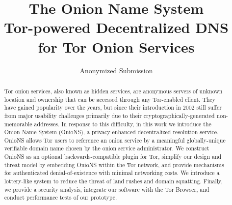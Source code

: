 \documentclass[USenglish,oneside,twocolumn]{article}
\begin{document}
\author[1]{Anonymized Submission}


\title{\huge The Onion Name System \large \\ Tor-powered Decentralized DNS for Tor Onion Services}

\begin{abstract} {
Tor onion services, also known as hidden services, are anonymous servers of unknown location and ownership that can be accessed through any Tor-enabled client. They have gained popularity over the years, but since their introduction in 2002 still suffer from major usability challenges primarily due to their cryptographically-generated non-memorable addresses. \newline \hspace*{1em} In response to this difficulty, in this work we introduce the Onion Name System (OnioNS), a privacy-enhanced decentralized resolution service. OnioNS allows Tor users to reference an onion service by a meaningful globally-unique verifiable domain name chosen by the onion service administrator. We construct OnioNS as an optional backwards-compatible plugin for Tor, simplify our design and threat model by embedding OnioNS within the Tor network, and provide mechanisms for authenticated denial-of-existence with minimal networking costs. We introduce a lottery-like system to reduce the threat of land rushes and domain squatting. Finally, we provide a security analysis, integrate our software with the Tor Browser, and conduct performance tests of our prototype.
}
\end{abstract}
  
\end{document}
